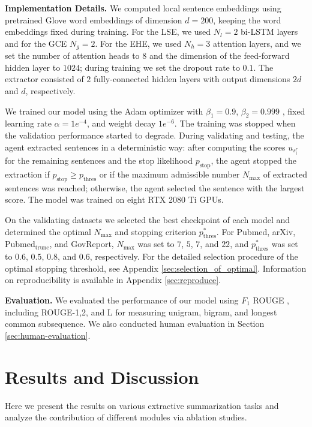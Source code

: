 \documentclass[11pt]{article}
\begin{document}
\noindent\textbf{Implementation Details.} 
We computed local sentence embeddings using pretrained Glove word embeddings \cite{pennington2014glove} of dimension $d=200$, keeping the word embeddings fixed during training. For the LSE, we used $N_l=2$ bi-LSTM layers and for the GCE $N_g=2$. For the EHE, we used $N_h=3$ attention layers, and we set the number of attention heads to $8$ and the dimension of the feed-forward hidden layer to $1024$; during training we set the dropout rate to $0.1$. The extractor consisted of $2$ fully-connected hidden layers with output dimensions $2d$ and $d$, respectively. 


We trained our model using the Adam optimizer with $\beta_1=0.9$, $\beta_2=0.999$ \cite{DBLP:journals/corr/KingmaB14}, fixed learning rate $\alpha=1e^{-4}$, and weight decay $1e^{-6}$. 
The training was stopped when the validation performance started to degrade.
During validating and testing, the agent extracted sentences in a deterministic way: after computing the scores $u_{s_i^r}$ for the remaining sentences and the stop likelihood $p_\text{stop}$, the agent stopped the extraction if $p_\text{stop}\geq p_\text{thres}$ or if the maximum admissible number $N_\text{max}$ of extracted sentences was reached; otherwise, the agent selected the sentence with the largest score. The model was trained on eight RTX 2080 Ti GPUs. 

On the validating datasets we selected the best checkpoint of each model and determined the optimal $N_\text{max}$ and stopping criterion $p^*_\text{thres}$. For Pubmed, arXiv, Pubmed$_\text{trunc}$, and GovReport, $N_\text{max}$ was set to $7$, $5$, $7$, and $22$, and  $p^*_\text{thres}$ was set to $0.6$, $0.5$, $0.8$, and $0.6$, respectively. For the detailed selection procedure of the optimal stopping threshold, see Appendix \ref{sec:selection_of_optimal}. Information on reproducibility is available in Appendix \ref{sec:reproduce}.

\noindent\textbf{Evaluation.} We evaluated the performance of our model using $F_1$ ROUGE \cite{lin2004rouge}, including ROUGE-1,2, and L for measuring unigram, bigram, and longest common subsequence. We also conducted human evaluation in Section \ref{sec:human-evaluation}.


\section{Results and Discussion}
Here we present the results on various extractive summarization tasks and analyze the contribution of different modules via ablation studies.
\end{document}
